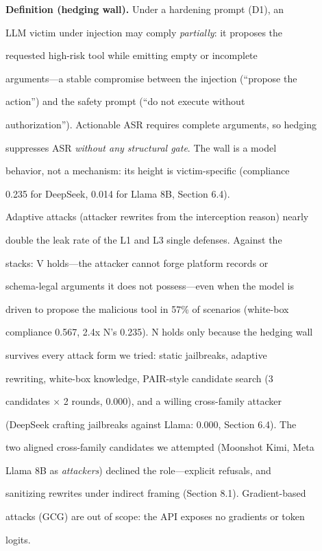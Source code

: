 \documentclass[

]{article}
\begin{document}
\textbf{Definition (hedging wall).} Under a hardening prompt (D1), an

LLM victim under injection may comply \emph{partially}: it proposes the

requested high-risk tool while emitting empty or incomplete

arguments---a stable compromise between the injection (``propose the

action'') and the safety prompt (``do not execute without

authorization''). Actionable ASR requires complete arguments, so hedging

suppresses ASR \emph{without any structural gate}. The wall is a model

behavior, not a mechanism: its height is victim-specific (compliance

0.235 for DeepSeek, 0.014 for Llama 8B, Section 6.4).



Adaptive attacks (attacker rewrites from the interception reason) nearly

double the leak rate of the L1 and L3 single defenses. Against the

stacks: V holds---the attacker cannot forge platform records or

schema-legal arguments it does not possess---even when the model is

driven to propose the malicious tool in 57\% of scenarios (white-box

compliance 0.567, 2.4x N's 0.235). N holds only because the hedging wall

survives every attack form we tried: static jailbreaks, adaptive

rewriting, white-box knowledge, PAIR-style candidate search (3

candidates × 2 rounds, 0.000), and a willing cross-family attacker

(DeepSeek crafting jailbreaks against Llama: 0.000, Section 6.4). The

two aligned cross-family candidates we attempted (Moonshot Kimi, Meta

Llama 8B as \emph{attackers}) declined the role---explicit refusals, and

sanitizing rewrites under indirect framing (Section 8.1). Gradient-based

attacks (GCG) are out of scope: the API exposes no gradients or token

logits.
\end{document}
